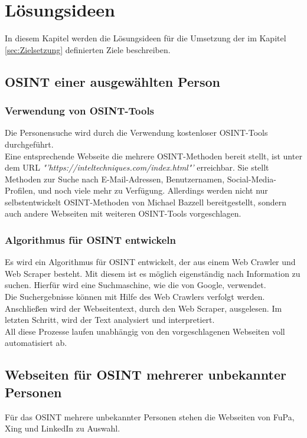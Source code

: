 
\chapter{Lösungsideen}  %
\label{cha:Lösungsideen} %
In diesem Kapitel werden die Lösungsideen für die Umsetzung der im Kapitel \ref{sec:Zielsetzung} definierten Ziele beschreiben.

\section{OSINT einer ausgewählten Person}
	\subsection{Verwendung von OSINT-Tools}
	Die Personensuche wird durch die Verwendung kostenloser OSINT-Tools durchgeführt.\\ 
	Eine entsprechende Webseite die mehrere OSINT-Methoden bereit stellt, ist unter dem URL \textit{"'https://inteltechniques.com/index.html"'} erreichbar. Sie stellt Methoden zur Suche nach E-Mail-Adressen, Benutzernamen, Social-Media-Profilen, und noch viele mehr zu Verfügung. Allerdings werden nicht nur selbstentwickelt OSINT-Methoden von Michael Bazzell bereitgestellt, sondern auch andere Webseiten mit weiteren OSINT-Tools vorgeschlagen.
	
	\subsection{Algorithmus für OSINT entwickeln}
	Es wird ein Algorithmus für OSINT entwickelt, der aus einem Web Crawler und Web Scraper besteht. Mit diesem ist es möglich eigenständig nach Information zu suchen. Hierfür wird eine Suchmaschine, wie die von Google, verwendet.\\
	Die Suchergebnisse können mit Hilfe des Web Crawlers verfolgt werden. Anschließen wird der Webseitentext, durch den Web Scraper, ausgelesen. Im letzten Schritt, wird der Text analysiert und interpretiert.\\
	All diese Prozesse laufen unabhängig von den vorgeschlagenen Webseiten voll automatisiert ab.


\section{Webseiten für OSINT mehrerer unbekannter Personen}
Für das OSINT mehrere unbekannter Personen stehen die Webseiten von FuPa, Xing und LinkedIn zu Auswahl.
